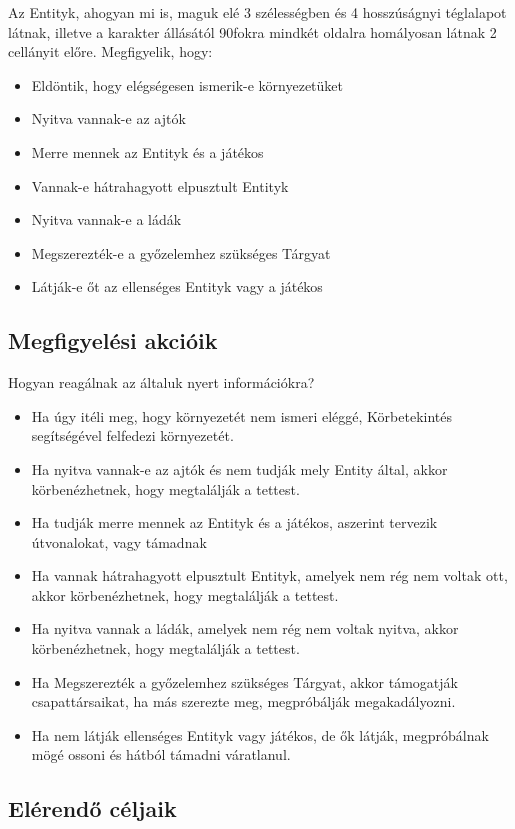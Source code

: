 Az Entityk, ahogyan mi is, maguk elé 3 szélességben és 4 hosszúságnyi téglalapot látnak, illetve a karakter állásától 90fokra mindkét oldalra homályosan látnak 2 cellányit előre.
Megfigyelik, hogy:
\begin{itemize}
    \item Eldöntik, hogy elégségesen ismerik-e környezetüket
    \item Nyitva vannak-e az ajtók
    \item Merre mennek az Entityk és a játékos
    \item Vannak-e hátrahagyott elpusztult Entityk
    \item Nyitva vannak-e a ládák
    \item Megszerezték-e a győzelemhez szükséges Tárgyat
    \item Látják-e őt az ellenséges Entityk vagy a játékos
\end{itemize}

\subsection{Megfigyelési akcióik}

Hogyan reagálnak az általuk nyert információkra?
\begin{itemize}
    \item Ha úgy itéli meg, hogy környezetét nem ismeri eléggé, Körbetekintés segítségével felfedezi környezetét.
    \item Ha nyitva vannak-e az ajtók és nem tudják mely Entity által, akkor körbenézhetnek, hogy megtalálják a tettest.
    \item Ha tudják merre mennek az Entityk és a játékos, aszerint tervezik útvonalokat, vagy támadnak
    \item Ha vannak hátrahagyott elpusztult Entityk, amelyek nem rég nem voltak ott, akkor körbenézhetnek, hogy megtalálják a tettest.
    \item Ha nyitva vannak a ládák, amelyek nem rég nem voltak nyitva, akkor körbenézhetnek, hogy megtalálják a tettest.
    \item Ha Megszerezték a győzelemhez szükséges Tárgyat, akkor támogatják csapattársaikat, ha más szerezte meg, megpróbálják megakadályozni.
    \item Ha nem látják ellenséges Entityk vagy játékos, de ők látják, megpróbálnak mögé ossoni és hátból támadni váratlanul.
\end{itemize}

\subsection{Elérendő céljaik}

